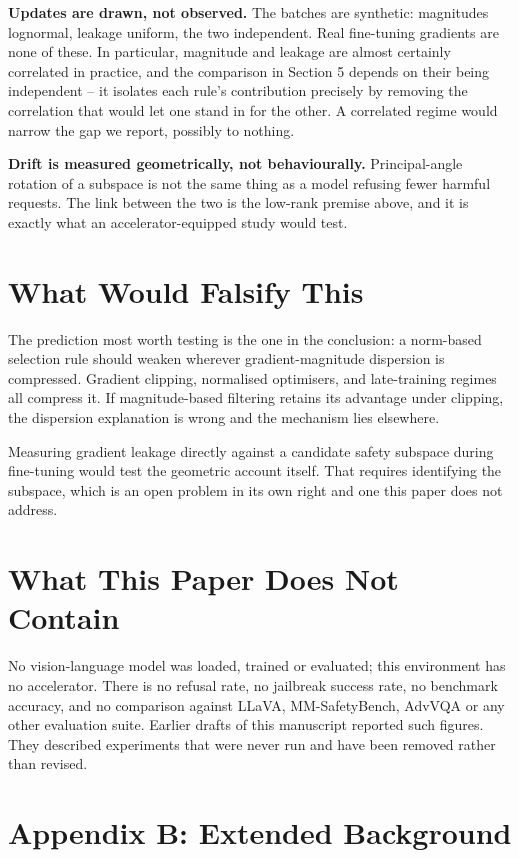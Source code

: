 \documentclass{article}
\begin{document}
\textbf{Updates are drawn, not observed.} The batches are synthetic: magnitudes lognormal, leakage uniform, the two independent. Real fine-tuning gradients are none of these. In particular, magnitude and leakage are almost certainly correlated in practice, and the comparison in Section 5 depends on their being independent -- it isolates each rule's contribution precisely by removing the correlation that would let one stand in for the other. A correlated regime would narrow the gap we report, possibly to nothing.

\textbf{Drift is measured geometrically, not behaviourally.} Principal-angle rotation of a subspace is not the same thing as a model refusing fewer harmful requests. The link between the two is the low-rank premise above, and it is exactly what an accelerator-equipped study would test.


\section{What Would Falsify This}


The prediction most worth testing is the one in the conclusion: a norm-based selection rule should weaken wherever gradient-magnitude dispersion is compressed. Gradient clipping, normalised optimisers, and late-training regimes all compress it. If magnitude-based filtering retains its advantage under clipping, the dispersion explanation is wrong and the mechanism lies elsewhere.

Measuring gradient leakage directly against a candidate safety subspace during fine-tuning would test the geometric account itself. That requires identifying the subspace, which is an open problem in its own right and one this paper does not address.


\section{What This Paper Does Not Contain}


No vision-language model was loaded, trained or evaluated; this environment has no accelerator. There is no refusal rate, no jailbreak success rate, no benchmark accuracy, and no comparison against LLaVA, MM-SafetyBench, AdvVQA or any other evaluation suite. Earlier drafts of this manuscript reported such figures. They described experiments that were never run and have been removed rather than revised.




\section{Appendix B: Extended Background}
\end{document}
